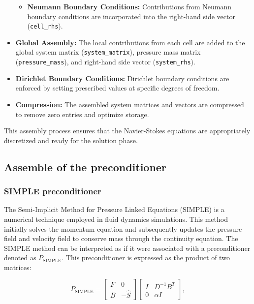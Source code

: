 \documentclass{article}
\begin{document}
\begin{itemize}
\begin{itemize}
            \item \textbf{Neumann Boundary Conditions:} Contributions from Neumann boundary conditions are incorporated into the right-hand side vector (\texttt{cell\_rhs}).
        \end{itemize}
    
    \item \textbf{Global Assembly:} The local contributions from each cell are added to the global system matrix (\texttt{system\_matrix}), pressure mass matrix (\texttt{pressure\_mass}), and right-hand side vector (\texttt{system\_rhs}).

    \item \textbf{Dirichlet Boundary Conditions:} Dirichlet boundary conditions are enforced by setting prescribed values at specific degrees of freedom.

    \item \textbf{Compression:} The assembled system matrices and vectors are compressed to remove zero entries and optimize storage.
\end{itemize}

This assembly process ensures that the Navier-Stokes equations are appropriately discretized and ready for the solution phase.

\subsection{Assemble of the preconditioner}
\subsubsection{SIMPLE preconditioner}

The Semi-Implicit Method for Pressure Linked Equations (SIMPLE) is a numerical technique employed in fluid dynamics simulations. This method initially solves the momentum equation and subsequently updates the pressure field and velocity field to conserve mass through the continuity equation.
The SIMPLE method can be interpreted as if it were associated with a preconditioner denoted as \(P_{\text{SIMPLE}}\). This preconditioner is expressed as the product of two matrices:

\begin{equation*}
    P_{\text{SIMPLE}} =
    \begin{bmatrix}
        F & 0 \\
        B & -\hat{S}
    \end{bmatrix}
    \begin{bmatrix}
        I & D^{-1} B^T \\
        0 & \alpha I
    \end{bmatrix},
\end{equation*}
\end{document}
